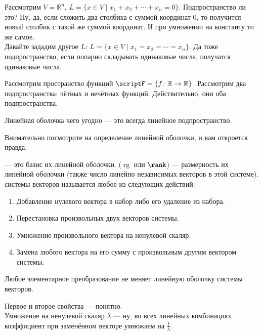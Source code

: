 \documentclass{article}
\begin{document}
\begin{itemize}
\begin{Example}
        \end{Example}
        \begin{Example}
            Рассмотрим $V=\mathbb R^n$, $L=\{x\in V\mid x_1+x_2+\cdots+x_n=0\}$. Подпространство ли это? Ну, да, если сложить два столбика с суммой координат 0, то получится новый столбик с такой же суммой координат. И при умножении на константу то же самое.\\
            Давайте зададим другое $L$: $L=\{x\in V\mid x_1=x_2=\cdots=x_n\}$. Да тоже подпространство, если попарно складывать одинаковые числа, получатся одинаковые числа.
        \end{Example}
        \begin{Example}
            Рассмотрим пространство функций $\scriptF=\{f\colon\mathbb R\to\mathbb R\}$. Рассмотрим два подпространства: чётных и нечётных функций. Действительно, они оба подпространства.
        \end{Example}
        \thm Линейная оболочка чего угодно --- это всегда линейное подпространство.
        \begin{Proof}
            Внимательно посмотрите на определение линейной оболочки, и вам откроется правда.
        \end{Proof}
        \dfn {} --- это базис их линейной оболочки.
        \dfn {} ($\operatorname{rg}$ или $\rank$) --- размерность их линейной оболочки (также число линейно независимых векторов в этой системе).
        \dfn {} системы векторов называется любое из следующих действий:
        \begin{enumerate}[1)]
            \item Добавление нулевого вектора в набор либо его удаление из набора.
            \item Перестановка произвольных двух векторов системы.
            \item Умножение произвольного вектора на ненулевой скаляр.
            \item Замена любого вектора на его сумму с произвольным другим вектором системы.
        \end{enumerate}
        \thm Любое элементарное преобразование не меняет линейную оболочку системы векторов.
        \begin{Proof}
            Первое и второе свойства --- понятно.\\
            Умножение на ненулевой скаляр $\lambda$ --- ну, во всех линейных комбинациях коэффициент при заменённом векторе умножаем на $\frac1\lambda$.\\

\end{Proof}
\end{itemize}
\end{document}
